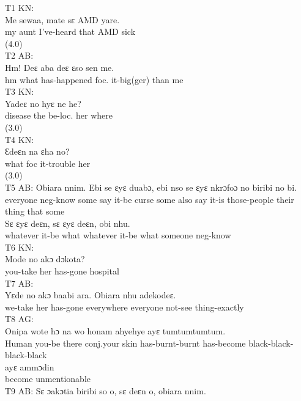 \documentclass[output=paper,colorlinks,citecolor=brown]{langscibook}
\begin{document}
\ea%
    T1 KN:\\
    \gll    Me sewaa, mate sɛ AMD yare.\\
            my aunt I’ve-heard that AMD sick \\
            (4.0)\\
\ex%
    T2 AB:\\
    \gll    Hm! Deɛ aba deɛ ɛso sen me.\\
            hm what has-happened foc. it-big(ger) than me\\
\ex%
    T3 KN:\\
    \gll    Yadeɛ no hyɛ ne he?\\
            disease the be-loc. her where\\
            (3.0) \\
\ex%
    T4 KN:\\
    \gll    Ɛdeɛn na ɛha no?\\
            what foc it-trouble her\\
            (3.0)\\
\ex%
    T5 AB:
    \ea
    \gll    Obiara nnim. Ebi se ɛyɛ duabɔ, ebi nso se ɛyɛ nkrɔfoɔ no biribi no bi.\\ 
            everyone neg-know some say it-be curse some also say it-is those-people their thing that some\\
    \ex
    \gll    Sɛ ɛyɛ deɛn, sɛ ɛyɛ deɛn, obi nhu.\\
            whatever it-be what whatever it-be what someone neg-know\\
    \z
\ex%
    T6 KN:\\
    \gll    Mode no akɔ dɔkota?\\
            you-take her has-gone hospital \\
\ex%
    T7 AB:\\
    \gll    Yɛde no akɔ baabi ara. Obiara nhu adekodeɛ.\\
            we-take her has-gone everywhere everyone not-see thing-exactly\\
\ex%
    T8 AG:\\
    \ea
    \gll    Onipa wote hɔ na wo honam ahyehye ayɛ tumtumtumtum.\\
            Human you-be there conj.your skin has-burnt-burnt has-become black-black-black-black \\
    \ex
    \gll    ayɛ ammɔdin \\
            become unmentionable \\
    \z
\ex%
    T9 AB:
    \ea
    \gll    Sɛ ɔakɔtia biribi so o, sɛ deɛn o, obiara nnim. \\
\end{document}
